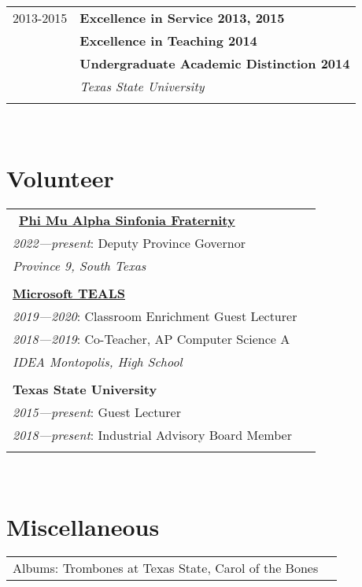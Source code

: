 \documentclass[10pt]{article} %
\newcommand\tab[1][1cm]{\hspace*{#1}}
\begin{document}
\begin{minipage}[t]{0.44\textwidth}
\begin{tabular}{rl}
2013-2015     & \textbf{Excellence in Service 2013, 2015}\\
& \textbf{Excellence in Teaching 2014}\\
& \textbf{Undergraduate Academic Distinction 2014}\\
& \textit{Texas State University}\\\\

\end{tabular}\\


\section{Volunteer} 

\begin{tabular}{ll}\
\href{https://province9.org}{\textbf{Phi Mu Alpha Sinfonia Fraternity}}\\
\tab\textit{2022—present}: Deputy Province Governor\\
\tab\tab\textit {Province 9, South Texas}\\
\\

\href{https://www.microsoft.com/en-us/teals}{\textbf{Microsoft TEALS}}\\
\tab\textit{2019—2020}: Classroom Enrichment Guest Lecturer\\
\tab\textit{2018—2019}: Co-Teacher, AP Computer Science A\\
\tab\tab\textit {IDEA Montopolis, High School}\\
\\

\textbf{Texas State University}\\
\tab\textit{2015—present}: Guest Lecturer\\
\tab\textit{2018—present}: Industrial Advisory Board Member\\
\\

\end{tabular}\\


\section{Miscellaneous} 

\begin{tabular}{ll}
Albums: Trombones at Texas State, Carol of the Bones \\
\end{tabular}\\

\end{minipage}
\end{document}
